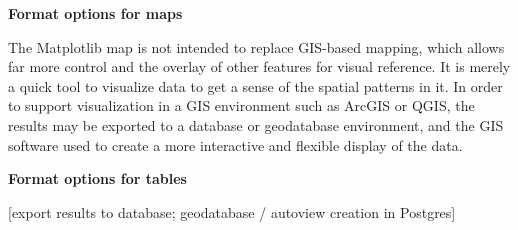 \bf{Format options for maps}

The Matplotlib map is not intended to replace GIS-based mapping, which
allows far more control and the overlay of other features for visual
reference.  It is merely a quick tool to visualize data to get a sense
of the spatial patterns in it.  In order to support visualization in a
GIS environment such as ArcGIS or QGIS, the results may be exported to
a database or geodatabase environment, and the GIS software used to
create a more interactive and flexible display of the data.


\bf{Format options for tables}


[export results to database; geodatabase / autoview creation in
Postgres]



% 
% 
% 
% 
% 
% 
% 
